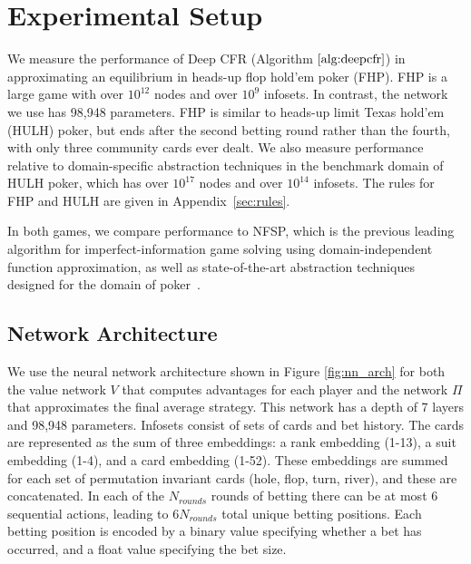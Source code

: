 \documentclass{article}
\begin{document}
\section{Experimental Setup}
\vspace{-0.03in}
We measure the performance of Deep CFR (Algorithm $\ref{alg:deepcfr}$) in approximating an equilibrium in heads-up flop hold'em poker (FHP). FHP is a large game with over $10^{12}$ nodes and over $10^9$ infosets. In contrast, the network we use has 98,948 parameters. FHP is similar to heads-up limit Texas hold'em (HULH) poker, but ends after the second betting round rather than the fourth, with only three community cards ever dealt. We also measure performance relative to domain-specific abstraction techniques in the benchmark domain of HULH poker, which has over $10^{17}$ nodes and over $10^{14}$ infosets. The rules for FHP and HULH are given in Appendix~\ref{sec:rules}.

In both games, we compare performance to NFSP, which is the previous leading algorithm for imperfect-information game solving using domain-independent function approximation, as well as state-of-the-art abstraction techniques designed for the domain of poker~\cite{Johanson13:Evaluating,Ganzfried14:Potential-Aware,Brown15:Hierarchical}.
\subsection{Network Architecture}
\vspace{-0.03in}
We use the neural network architecture shown in Figure \ref{fig:nn_arch} for both the value network $V$ that computes advantages for each player and the network $\Pi$ that approximates the final average strategy. This network has a depth of 7 layers and 98,948 parameters. Infosets consist of sets of cards and bet history. The cards are represented as the sum of three embeddings: a rank embedding (1-13), a suit embedding (1-4), and a card embedding (1-52). These embeddings are summed for each set of permutation invariant cards (hole, flop, turn, river), and these are concatenated. In each of the $N_\textit{rounds}$ rounds of betting there can be at most $6$ sequential actions, leading to $6 N_\textit{rounds}$ total unique betting positions. Each betting position is encoded by a binary value specifying whether a bet has occurred, and a float value specifying the bet size.
\end{document}
